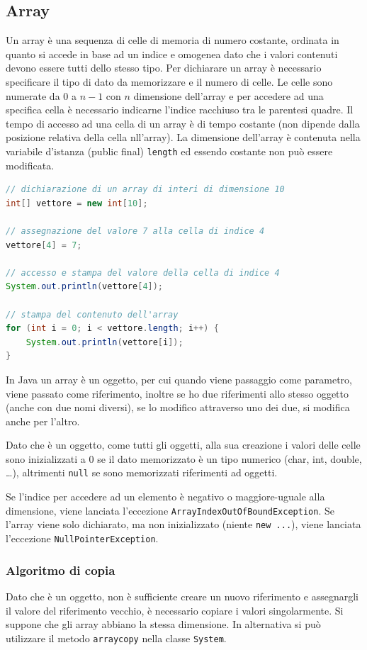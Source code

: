 \documentclass[a4paper]{article}
\begin{document}
\subsection{Array}
Un array è una sequenza di celle di memoria di numero costante, ordinata in quanto si accede in base ad un indice e omogenea
dato che i valori contenuti devono essere tutti dello stesso tipo. Per dichiarare un array è necessario specificare il tipo
di dato da memorizzare e il numero di celle. Le celle sono numerate da \(0\) a \(n-1\) con \(n\) dimensione dell'array e per
accedere ad una specifica cella è necessario indicarne l'indice racchiuso tra le parentesi quadre. Il tempo di accesso ad una
cella di un array è di tempo costante (non dipende dalla posizione relativa della cella nll'array). La dimensione dell'array
è contenuta nella variabile d'istanza (public final) \verb|length| ed essendo costante non può essere modificata.

\begin{lstlisting}[language=Java]
// dichiarazione di un array di interi di dimensione 10
int[] vettore = new int[10];

// assegnazione del valore 7 alla cella di indice 4
vettore[4] = 7;

// accesso e stampa del valore della cella di indice 4
System.out.println(vettore[4]);

// stampa del contenuto dell'array
for (int i = 0; i < vettore.length; i++) {
	System.out.println(vettore[i]);
}
\end{lstlisting}

In Java un array è un oggetto, per cui quando viene passaggio come parametro, viene passato come riferimento, inoltre se ho due
riferimenti allo stesso oggetto (anche con due nomi diversi), se lo modifico attraverso uno dei due, si modifica anche per l'altro. 

Dato che è un oggetto, come tutti gli oggetti, alla sua creazione i valori delle celle sono inizializzati a 0 se il dato
memorizzato è un tipo numerico (char, int, double, \dots), altrimenti \verb|null| se sono memorizzati riferimenti ad oggetti.

Se l'indice per accedere ad un elemento è negativo o maggiore-uguale alla dimensione, viene lanciata l'eccezione
\verb|ArrayIndexOutOfBoundException|. Se l'array viene solo dichiarato, ma non inizializzato (niente \verb|new ...|), viene
lanciata l'eccezione \verb|NullPointerException|.

\subsubsection*{Algoritmo di copia}
Dato che è un oggetto, non è sufficiente creare un nuovo riferimento e assegnargli il valore del riferimento vecchio, è necessario
copiare i valori singolarmente. Si suppone che gli array abbiano la stessa dimensione. In alternativa si può utilizzare il metodo
\verb|arraycopy| nella classe \verb|System|.
\end{document}

